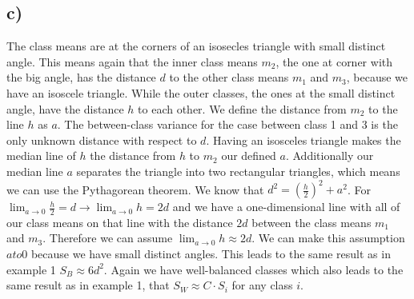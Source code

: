 \documentclass[paper=a4,fontsize=10pt,DIV11,BCOR10mm]{scrartcl}
\begin{document}
\subsection*{c)}
The class means are at the corners of an isosecles triangle with small distinct angle. This means again that the inner class means $m_2$, the one at corner with the big angle, has the distance $d$ to the other class means $m_1$ and $m_3$, because we have an isoscele triangle. While the outer classes, the ones at the small distinct angle, have the distance $h$ to each other. We define the distance from $m_2$ to the line $h$ as $a$. The between-class variance for the case between class 1 and 3 is the only unknown distance with respect to $d$. Having an isosceles triangle makes the median line of $h$ the distance from $h$ to $m_2$ our defined $a$. Additionally our median line $a$ separates the triangle into two rectangular triangles, which means we can use the Pythagorean theorem. We know that $ d^2 = (\frac{h}{2})^2 + a^2$. For $\lim_{a \to 0} \frac{h}{2} = d \rightarrow \lim_{a \to 0} h = 2d $ and we have a one-dimensional line with all of our class means on that line with the distance $2d$ between the class means $m_1$ and $m_3$. Therefore we can assume $\lim_{a \to 0}h \approx 2d$. We can make this assumption $a to 0$ because we have small distinct angles. This leads to the same result as in example 1 $S_B \approx 6d^2$.
Again we have well-balanced classes which also leads to the same result as in example 1, that $S_W \approx C \cdot S_i$ for any class $i$.

 
\end{document}
